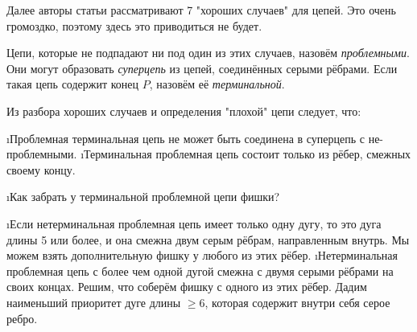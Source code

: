 \begin{proofstar}
Далее авторы статьи рассматривают 7 "хороших случаев" для цепей. Это очень громоздко, поэтому здесь это приводиться не будет.

\begin{defn}
Цепи, которые не подпадают ни под один из этих случаев, назовём \textit{проблемными}. Они могут образовать \textit{суперцепь} из цепей, соединённых серыми рёбрами. Если такая цепь содержит конец $P$, назовём её \textit{терминальной}. 
\end{defn}

Из разбора хороших случаев и определения "плохой" цепи следует, что:
\begin{enumerate}
\i Проблемная терминальная цепь не может быть соединена в суперцепь с не-проблемными.
\i Терминальная проблемная цепь состоит только из рёбер, смежных своему концу.

\i Как забрать у терминальной проблемной цепи фишки?
\begin{itemize}
\i Если нетерминальная проблемная цепь имеет только одну дугу, то это дуга длины 5 или более, и она смежна двум серым рёбрам, направленным внутрь. Мы можем взять дополнительную фишку у любого из этих рёбер.
\i Нетерминальная проблемная цепь с более чем одной дугой смежна с двумя серыми рёбрами на своих концах. Решим, что соберём фишку с одного из этих рёбер. Дадим наименьший приоритет дуге длины $\ge 6$, которая содержит внутри себя серое ребро. %
\end{itemize}
\end{enumerate}


\end{proofstar}
